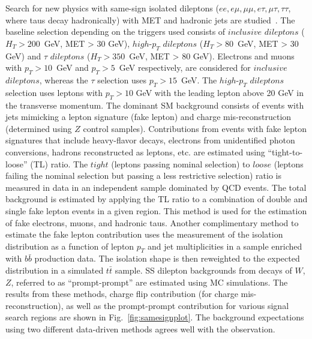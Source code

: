 \documentclass{PoS}
\begin{document}
Search for new physics with same-sign isolated dileptons ($ee, e\mu, \mu\mu, e\tau, \mu\tau, \tau\tau$, where taus decay hadronically) with MET and hadronic 
jets are studied~\cite{bib:ss}. The baseline selection depending on the triggers used consists of $inclusive$ $dileptons$ ($H_T > 200$~GeV, MET > 30 GeV),  $high$-$p_T$ $dileptons$ 
($H_T > 80$~GeV, MET > 30 GeV) 
and $\tau$ $dileptons$ ($H_T > 350$~GeV, MET > 80 GeV). Electrons and muons with $p_T > 10$~GeV and $p_T > 5$~GeV respectively, are considered for $inclusive$ $dileptons$, 
whereas the $\tau$ selection uses $p_T > 15$~GeV. The $high$-$p_T$ $dileptons$ selection uses leptons with $p_T > 10$ GeV with the leading lepton above 20 GeV in the transverse momentum. 
The dominant SM background consists of events with jets mimicking a lepton signature (fake lepton) and charge mis-reconstruction 
(determined using $Z$ control samples). Contributions from events with fake lepton signatures that include heavy-flavor decays, electrons from unidentified photon conversions, 
hadrons reconstructed as leptons, etc. are estimated using ``tight-to-loose'' (TL) ratio. The $tight$ (leptons passing nominal selection) to $loose$ (leptons 
failing the nominal selection but passing a less restrictive selection) ratio is measured in data
in an independent sample dominated by QCD events. The total background is estimated by applying the TL ratio to a combination of double and single fake
lepton events in a given region. This method is used for the estimation of fake electrons, muons, and hadronic taus. Another complimentary method to 
estimate the fake lepton contribution uses
the measurement of the isolation distribution as a function of lepton $p_T$ and jet multiplicities in a sample enriched with $b\bar{b}$ production data. The 
isolation shape is then reweighted to the expected distribution in a simulated $t\bar{t}$ sample. SS dilepton backgrounds from decays of $W$, $Z$, referred to 
as ``prompt-prompt'' are estimated using MC simulations.
The results from these methods, charge flip contribution (for charge mis-reconstruction), as well as the prompt-prompt contribution for various signal search regions  
are shown in Fig.~\ref{fig:samesignplot}. The background expectations using two different data-driven methods agrees well with the observation. 
\end{document}
